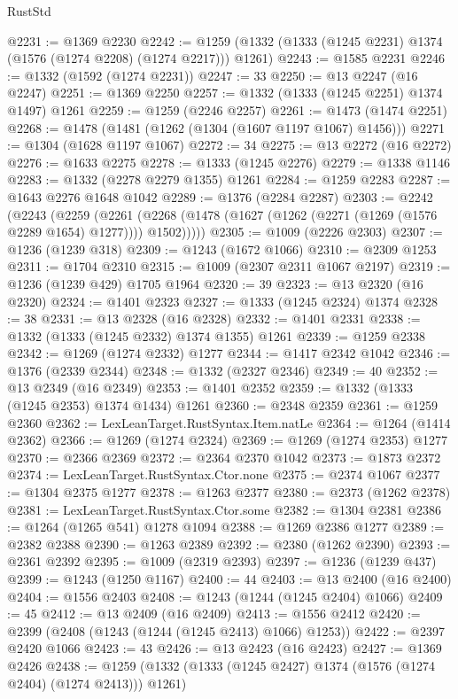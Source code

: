 \begin{lexlean}{RustStd}
\begin{coremodule}
@2231 := @1369 @2230
@2242 := @1259 (@1332 (@1333 (@1245 @2231) @1374 (@1576 (@1274 @2208) (@1274 @2217))) @1261)
@2243 := @1585 @2231
@2246 := @1332 (@1592 (@1274 @2231))
@2247 := 33
@2250 := @13 @2247 (@16 @2247)
@2251 := @1369 @2250
@2257 := @1332 (@1333 (@1245 @2251) @1374 @1497) @1261
@2259 := @1259 (@2246 @2257)
@2261 := @1473 (@1474 @2251)
@2268 := @1478 (@1481 (@1262 (@1304 (@1607 @1197 @1067) @1456)))
@2271 := @1304 (@1628 @1197 @1067)
@2272 := 34
@2275 := @13 @2272 (@16 @2272)
@2276 := @1633 @2275
@2278 := @1333 (@1245 @2276)
@2279 := @1338 @1146
@2283 := @1332 (@2278 @2279 @1355) @1261
@2284 := @1259 @2283
@2287 := @1643 @2276 @1648 @1042
@2289 := @1376 (@2284 @2287)
@2303 := @2242
    (@2243
      (@2259
        (@2261 (@2268 (@1478 (@1627 (@1262 (@2271 (@1269 (@1576 @2289 @1654) @1277)))) @1502)))))
@2305 := @1009 (@2226 @2303)
@2307 := @1236 (@1239 @318)
@2309 := @1243 (@1672 @1066)
@2310 := @2309 @1253
@2311 := @1704 @2310
@2315 := @1009 (@2307 @2311 @1067 @2197)
@2319 := @1236 (@1239 @429) @1705 @1964
@2320 := 39
@2323 := @13 @2320 (@16 @2320)
@2324 := @1401 @2323
@2327 := @1333 (@1245 @2324) @1374
@2328 := 38
@2331 := @13 @2328 (@16 @2328)
@2332 := @1401 @2331
@2338 := @1332 (@1333 (@1245 @2332) @1374 @1355) @1261
@2339 := @1259 @2338
@2342 := @1269 (@1274 @2332) @1277
@2344 := @1417 @2342 @1042
@2346 := @1376 (@2339 @2344)
@2348 := @1332 (@2327 @2346)
@2349 := 40
@2352 := @13 @2349 (@16 @2349)
@2353 := @1401 @2352
@2359 := @1332 (@1333 (@1245 @2353) @1374 @1434) @1261
@2360 := @2348 @2359
@2361 := @1259 @2360
@2362 := LexLeanTarget.RustSyntax.Item.natLe
@2364 := @1264 (@1414 @2362)
@2366 := @1269 (@1274 @2324)
@2369 := @1269 (@1274 @2353) @1277
@2370 := @2366 @2369
@2372 := @2364 @2370 @1042
@2373 := @1873 @2372
@2374 := LexLeanTarget.RustSyntax.Ctor.none
@2375 := @2374 @1067
@2377 := @1304 @2375 @1277
@2378 := @1263 @2377
@2380 := @2373 (@1262 @2378)
@2381 := LexLeanTarget.RustSyntax.Ctor.some
@2382 := @1304 @2381
@2386 := @1264 (@1265 @541) @1278 @1094
@2388 := @1269 @2386 @1277
@2389 := @2382 @2388
@2390 := @1263 @2389
@2392 := @2380 (@1262 @2390)
@2393 := @2361 @2392
@2395 := @1009 (@2319 @2393)
@2397 := @1236 (@1239 @437)
@2399 := @1243 (@1250 @1167)
@2400 := 44
@2403 := @13 @2400 (@16 @2400)
@2404 := @1556 @2403
@2408 := @1243 (@1244 (@1245 @2404) @1066)
@2409 := 45
@2412 := @13 @2409 (@16 @2409)
@2413 := @1556 @2412
@2420 := @2399 (@2408 (@1243 (@1244 (@1245 @2413) @1066) @1253))
@2422 := @2397 @2420 @1066
@2423 := 43
@2426 := @13 @2423 (@16 @2423)
@2427 := @1369 @2426
@2438 := @1259 (@1332 (@1333 (@1245 @2427) @1374 (@1576 (@1274 @2404) (@1274 @2413))) @1261)

\end{coremodule}
\end{lexlean}

